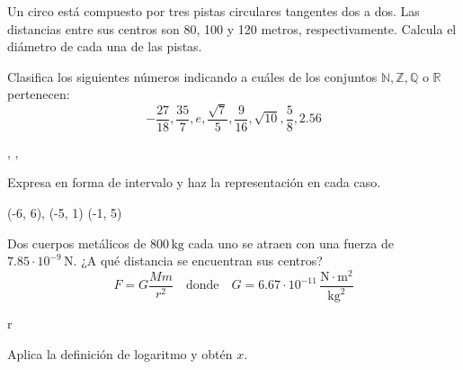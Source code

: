 \documentclass[12pt]{exam}
\begin{document}
\begin{questions}

\question Un circo está compuesto por tres pistas circulares tangentes dos a dos. Las distancias entre sus centros son 80, 100 y 120 metros, respectivamente. Calcula el diámetro de cada una de las pistas.


\question Clasifica los siguientes números indicando a cuáles de los conjuntos \( \mathbb{N}, \mathbb{Z}, \mathbb{Q} \) o \( \mathbb{R} \) pertenecen:
\[
-\frac{27}{18}, \frac{35}{7}, e, \frac{\sqrt{7}}{5}, \frac{9}{16}, \sqrt{10}, \frac{5}{8}, 2.56
\]
\begin{solution}
 , , 
\end{solution}

\question Expresa en forma de intervalo y haz la representación en cada caso.
\begin{solution}
 (-6, 6), (-5, 1)  (-1, 5)
\end{solution}

\question Dos cuerpos metálicos de \( 800 \, \text{kg} \) cada uno se atraen con una fuerza de \( 7.85 \cdot 10^{-9} \, \text{N} \). ¿A qué distancia se encuentran sus centros?
\[
F = G \frac{M m}{r^2} \quad \text{donde} \quad G = 6.67 \cdot 10^{-11} \, \frac{\text{N} \cdot \text{m}^2}{\text{kg}^2}
\]
\begin{solution}
r  
\end{solution}

\question Aplica la definición de logaritmo y obtén \( x \).
\end{questions}
\end{document}
